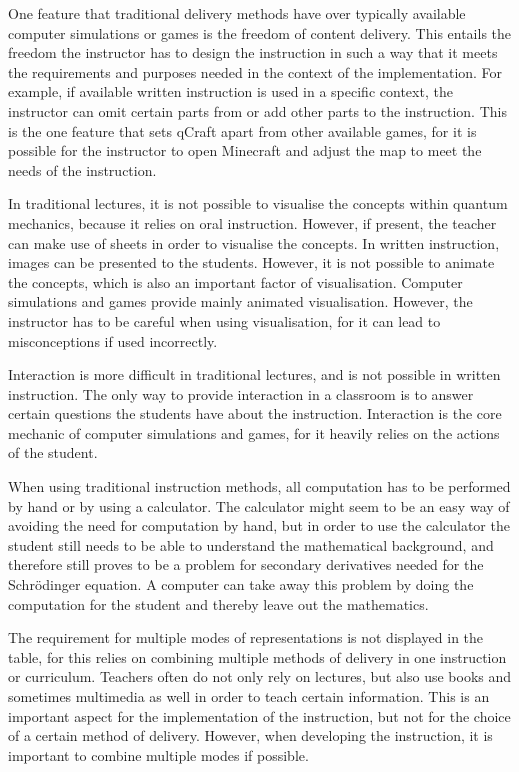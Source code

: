 \documentclass[11pt,twoside]{report} %
\begin{document}
One feature that traditional delivery methods have over typically available computer simulations or games is the freedom of content delivery. This entails the freedom the instructor has to design the instruction in such a way that it meets the requirements and purposes needed in the context of the implementation. For example, if available written instruction is used in a specific context, the instructor can omit certain parts from or add other parts to the instruction. This is the one feature that sets qCraft apart from other available games, for it is possible for the instructor to open Minecraft and adjust the map to meet the needs of the instruction.

In traditional lectures, it is not possible to visualise the concepts within quantum mechanics, because it relies on oral instruction. However, if present, the teacher can make use of sheets in order to visualise the concepts. In written instruction, images can be presented to the students. However, it is not possible to animate the concepts, which is also an important factor of visualisation. Computer simulations and games provide mainly animated visualisation. However, the instructor has to be careful when using visualisation, for it can lead to misconceptions if used incorrectly.

Interaction is more difficult in traditional lectures, and is not possible in written instruction. The only way to provide interaction in a classroom is to answer certain questions the students have about the instruction. Interaction is the core mechanic of computer simulations and games, for it heavily relies on the actions of the student.

When using traditional instruction methods, all computation has to be performed by hand or by using a calculator. The calculator might seem to be an easy way of avoiding the need for computation by hand, but in order to use the calculator the student still needs to be able to understand the mathematical background, and therefore still proves to be a problem for secondary derivatives needed for the Schrödinger equation. A computer can take away this problem by doing the computation for the student and thereby leave out the mathematics.

The requirement for multiple modes of representations is not displayed in the table, for this relies on combining multiple methods of delivery in one instruction or curriculum. Teachers often do not only rely on lectures, but also use books and sometimes multimedia as well in order to teach certain information. This is an important aspect for the implementation of the instruction, but not for the choice of a certain method of delivery. However, when developing the instruction, it is important to combine multiple modes if possible.
\end{document}
